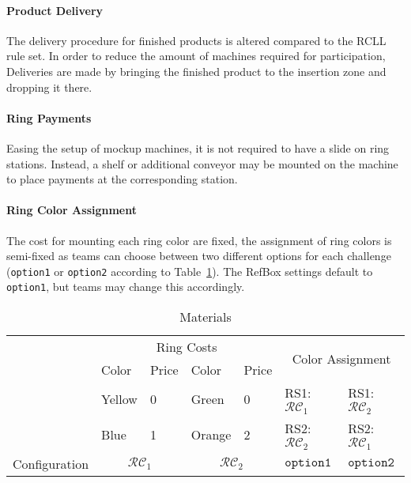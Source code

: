 \documentclass[12pt,twoside]{article}
\newcommand{\reftab}[1]{Table~\ref{#1}}
\begin{document}
\paragraph{Product Delivery}
The delivery procedure for finished products is altered compared to the
\ac{RCLL} rule set. In order to reduce the amount of machines required
for participation, Deliveries are made by bringing the finished product
to the insertion zone and dropping it there.

\paragraph{Ring Payments}
Easing the setup of mockup machines, it is not required to have a slide
on ring stations. Instead, a shelf or additional conveyor may be mounted on the
machine to place payments at the corresponding station.

\paragraph{Ring Color Assignment}
The cost for mounting each ring color are fixed, the assignment of ring colors
is semi-fixed as teams can choose between two different options for each
challenge (\texttt{option1} or \texttt{option2} according to
\reftab{tab:ring-costs}).
The RefBox settings default to \texttt{option1}, but teams may change this
accordingly.

\newcommand{\colconfig}{\mathcal{RC}}
\begin{table}[!htb]
 \centering
 \begin{tabular}{l|l|l||l|l||l|l}
  & \multicolumn{4}{c||}{Ring Costs}
  & \multicolumn{2}{c}{\multirow{2}{*}{Color Assignment }}\\\cline{2-5}
  & Color  & Price & Color  & Price & \multicolumn{2}{c}{}\\\cline{2-7}
  & Yellow & 0 & Green & 0
  & RS1: $\colconfig_1$ & RS1: $\colconfig_2$ \\
  & Blue  & 1 & Orange & 2
  & RS2: $\colconfig_2$ & RS2: $\colconfig_1$ \\\hline\hline
  Configuration & \multicolumn{2}{c||}{$\colconfig_1$}
  & \multicolumn{2}{c||}{$\colconfig_2$}
  & $\texttt{option1}$ & $\texttt{option2}$\\
 \end{tabular}
 \caption{Materials}
 \label{tab:ring-costs}
\end{table}
\end{document}
